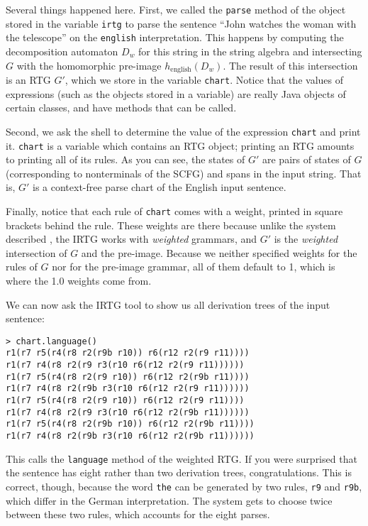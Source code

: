 \documentclass[11pt]{article}
\begin{document}
Several things happened here. First, we called the \verb?parse? method
of the object stored in the variable \verb?irtg? to parse the sentence
``John watches the woman with the telescope'' on the \verb?english?
interpretation. This happens by computing the decomposition automaton
$D_w$ for this string in the string algebra and intersecting $G$ with
the homomorphic pre-image $h_\mathrm{english}(D_w)$. The result of
this intersection is an RTG $G'$, which we store in the variable
\verb?chart?. Notice that the values of expressions (such as the
objects stored in a variable) are really Java objects of certain
classes, and have methods that can be called.

Second, we ask the shell to determine the value of the expression
\verb?chart? and print it. \verb?chart? is a variable which contains
an RTG object; printing an RTG amounts to printing all of its rules.
As you can see, the states of $G'$ are pairs of states of $G$
(corresponding to nonterminals of the SCFG) and spans in the input
string. That is, $G'$ is a context-free parse chart of the English
input sentence.

Finally, notice that each rule of \verb?chart? comes with a weight,
printed in square brackets behind the rule. These weights are there
because unlike the system described \cite{koller11}, the IRTG works
with \emph{weighted} grammars, and $G'$ is the \emph{weighted}
intersection of $G$ and the pre-image. Because we neither specified
weights for the rules of $G$ nor for the pre-image grammar, all of
them default to 1, which is where the 1.0 weights come from.

We can now ask the IRTG tool to show us all derivation trees of the
input sentence:

\begin{verbatim}
> chart.language()
r1(r7 r5(r4(r8 r2(r9b r10)) r6(r12 r2(r9 r11))))
r1(r7 r4(r8 r2(r9 r3(r10 r6(r12 r2(r9 r11))))))
r1(r7 r5(r4(r8 r2(r9 r10)) r6(r12 r2(r9b r11))))
r1(r7 r4(r8 r2(r9b r3(r10 r6(r12 r2(r9 r11))))))
r1(r7 r5(r4(r8 r2(r9 r10)) r6(r12 r2(r9 r11))))
r1(r7 r4(r8 r2(r9 r3(r10 r6(r12 r2(r9b r11))))))
r1(r7 r5(r4(r8 r2(r9b r10)) r6(r12 r2(r9b r11))))
r1(r7 r4(r8 r2(r9b r3(r10 r6(r12 r2(r9b r11))))))
\end{verbatim}

This calls the \verb?language? method of the weighted RTG. If you
were surprised that the sentence has eight rather than two derivation
trees, congratulations. This is correct, though, because the word
\verb?the? can be generated by two rules, \verb?r9? and \verb?r9b?,
which differ in the German interpretation. The system gets to choose
twice between these two rules, which accounts for the eight parses.
\end{document}
